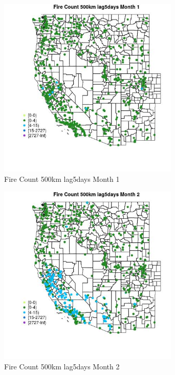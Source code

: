 \begin{figure} 
\centering  
\includegraphics[width=0.77\textwidth]{Code_Outputs/Report_ML_input_PM25_Step4_part_f_de_duplicated_aveswNAs_MapObsMo1Fire_Count_500km_lag5days.jpg} 
\caption{\label{fig:Report_ML_input_PM25_Step4_part_f_de_duplicated_aveswNAsMapObsMo1Fire_Count_500km_lag5days}Fire Count 500km lag5days Month 1} 
\end{figure} 
 

\clearpage 

\begin{figure} 
\centering  
\includegraphics[width=0.77\textwidth]{Code_Outputs/Report_ML_input_PM25_Step4_part_f_de_duplicated_aveswNAs_MapObsMo2Fire_Count_500km_lag5days.jpg} 
\caption{\label{fig:Report_ML_input_PM25_Step4_part_f_de_duplicated_aveswNAsMapObsMo2Fire_Count_500km_lag5days}Fire Count 500km lag5days Month 2} 
\end{figure} 
 

